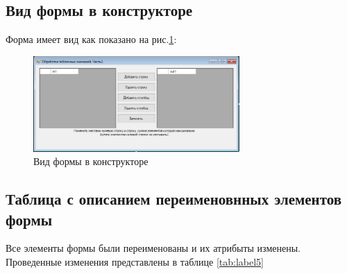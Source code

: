\subsection{Вид формы в конструкторе}

Форма имеет вид как показано на рис.\ref{fig:FormInConstruct5}:

\begin{figure}[!h]
    \centering
    \includegraphics[width = 0.7\textwidth]{images/Task5/FormInConstructor.png}
    \caption{Вид формы в конструкторе}
    \label{fig:FormInConstruct5}
\end{figure}

\subsection{Таблица с описанием переименовнных элементов формы}

Все элементы формы были переименованы и их атрибыты изменены. Проведенные изменения представлены в таблице \ref{tab:label5}

